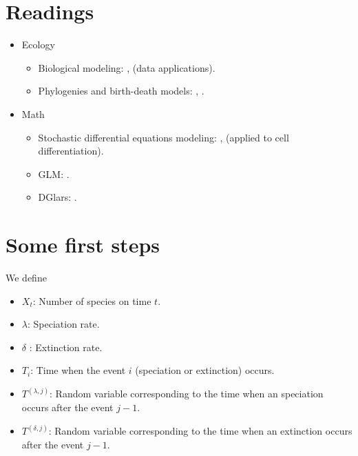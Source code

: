 \documentclass[a4paper,9pt]{extarticle}
\title{}
\author{}
\begin{document}
\maketitle




\section*{Readings}

\begin{itemize}
  \item Ecology
    \begin{itemize}
      \item Biological modeling: \cite{bulmer} , \cite{hilborn} (data applications).
      \item Phylogenies and birth-death models: \cite{etienne}, \cite{nee}.
    \end{itemize}
 \item Math
    \begin{itemize}
      \item Stochastic differential equations modeling: \cite{wilkinson}, \cite{pellin} (applied to cell differentiation). 
      \item GLM: \cite{dobson}.
      \item DGlars: \cite{augugliaro}.
    \end{itemize}
    
\end{itemize}

\section*{Some first steps}

  We define \begin{itemize}
  
\item  $X_t$: Number of species on time $t$. 
  
\item  $\lambda$: Speciation rate.
  
\item  $\delta$ : Extinction rate.
  
\item  $T_i$: Time when the event $i$ (speciation or extinction) occurs.
  
\item  $T^{(\lambda,j)}$: Random variable corresponding to the time when an speciation occurs after the event $j-1$.
  
\item  $T^{(\delta,j)}$: Random variable corresponding to the time when an extinction occurs after the event $j-1$.

\end{itemize}
\end{document}
